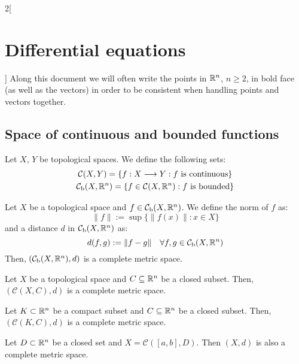 \documentclass[../../../main_math.tex]{subfiles}
\begin{document}
\renewcommand{\col}{\apl}
\begin{multicols}{2}[\section{Differential equations}]
  Along this document we will often write the points in $\mathbb{R}^n$, $n\geq 2$, in bold face (as well as the vectors) in order to be consistent when handling points and vectors together.
  \subsection{Space of continuous and bounded functions}
  \begin{definition}
    Let $X$, $Y$ be topological spaces. We define the following sets:
    \begin{gather*}
      \mathcal{C}(X,Y)=\{f:X\longrightarrow Y:f\text{ is continuous}\}\\
      \mathcal{C}_\text{b}(X,\mathbb{R}^n)=\{f\in\mathcal{C}(X,\mathbb{R}^n):f\text{ is bounded}\}
    \end{gather*}
  \end{definition}
  \begin{theorem}
    Let $X$ be a topological space and $f\in\mathcal{C}_\text{b}(X,\mathbb{R}^n)$. We define the norm of $f$ as: $$\|f\|:=\sup\{\|f(x)\|:x\in X\}$$ and a distance $d$ in $\mathcal{C}_\text{b}(X,\mathbb{R}^n)$ as: $$d(f,g):=\|f-g\|\quad\forall f,g\in\mathcal{C}_\text{b}(X,\mathbb{R}^n)$$
    Then, $(\mathcal{C}_\text{b}(X,\mathbb{R}^n),d)$ is a complete metric space.
  \end{theorem}
  \begin{theorem}
    Let $X$ be a topological space and $C\subseteq\mathbb{R}^n$ be a closed subset. Then, $(\mathcal{C}(X,C),d)$ is a complete metric space.
  \end{theorem}
  \begin{corollary}
    Let $K\subset \mathbb{R}^n$ be a compact subset and $C\subseteq\mathbb{R}^n$ be a closed subset. Then, $(\mathcal{C}(K,C),d)$ is a complete metric space.
  \end{corollary}
  \begin{corollary}
    Let $D\subset\mathbb{R}^n$ be a closed set and $X=\mathcal{C}([a,b],D)$. Then $(X,d)$ is also a complete metric space.
  \end{corollary}

\end{multicols}
\end{document}
